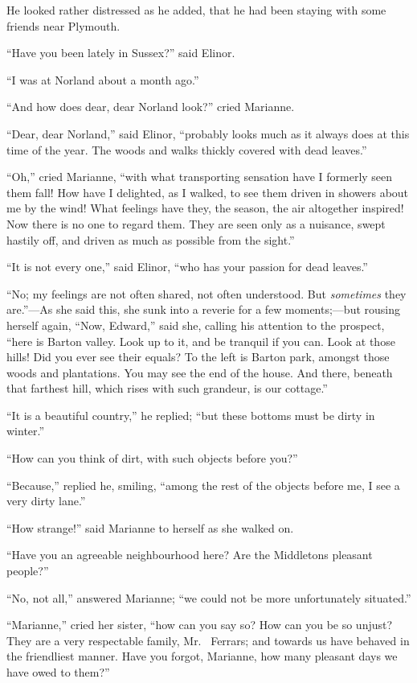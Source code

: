 He looked rather distressed as he added, that he
had been staying with some friends near Plymouth.

``Have you been lately in Sussex?'' said Elinor.

``I was at Norland about a month ago.''

``And how does dear, dear Norland look?'' cried Marianne.

``Dear, dear Norland,'' said Elinor, ``probably looks
much as it always does at this time of the year.
The woods and walks thickly covered with dead leaves.''

``Oh,'' cried Marianne, ``with what transporting sensation
have I formerly seen them fall!  How have I delighted,
as I walked, to see them driven in showers about me
by the wind!  What feelings have they, the season, the air
altogether inspired!  Now there is no one to regard them.
They are seen only as a nuisance, swept hastily off,
and driven as much as possible from the sight.''

``It is not every one,'' said Elinor, ``who has your
passion for dead leaves.''

``No; my feelings are not often shared, not often
understood.  But \emph{sometimes} they are.''---As she said this,
she sunk into a reverie for a few moments;---but rousing
herself again, ``Now, Edward,'' said she, calling his attention
to the prospect, ``here is Barton valley.  Look up to it,
and be tranquil if you can.  Look at those hills!
Did you ever see their equals?  To the left is Barton park,
amongst those woods and plantations.  You may see the end
of the house.  And there, beneath that farthest hill,
which rises with such grandeur, is our cottage.''

``It is a beautiful country,'' he replied; ``but these
bottoms must be dirty in winter.''

``How can you think of dirt, with such objects before you?''

``Because,'' replied he, smiling, ``among the rest of the
objects before me, I see a very dirty lane.''

``How strange!'' said Marianne to herself as she walked on.

``Have you an agreeable neighbourhood here?  Are the
Middletons pleasant people?''

``No, not all,'' answered Marianne; ``we could not
be more unfortunately situated.''

``Marianne,'' cried her sister, ``how can you say so? How can
you be so unjust?  They are a very respectable family, Mr.\ %
Ferrars;
and towards us have behaved in the friendliest manner.  Have you
forgot, Marianne, how many pleasant days we have owed to them?''

